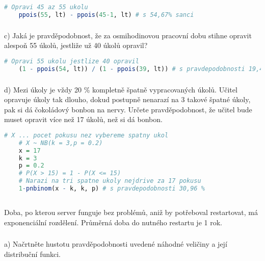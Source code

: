 \documentclass{article}%
\begin{document}
\begin{lstlisting}[language=R, showstringspaces=false, basicstyle=\small]
    # Opravi 45 az 55 ukolu
    ppois(55, lt) - ppois(45-1, lt) # s 54,67% sanci
\end{lstlisting}

\subsubsection{}
c) Jaká je pravděpodobnost, že za osmihodinovou pracovní dobu stihne opravit alespoň 55 úkolů, jestliže už 40 úkolů opravil?

\begin{lstlisting}[language=R, showstringspaces=false, basicstyle=\small]
    # Opravi 55 ukolu jestlize 40 opravil
    (1 - ppois(54, lt)) / (1 - ppois(39, lt)) # s pravdepodobnosti 19,4 %
\end{lstlisting}

\subsubsection{}
d) Mezi úkoly je vždy 20 \% kompletně špatně vypracovaných úkolů. Učitel opravuje úkoly tak dlouho, dokud postupně nenarazí na 3 takové špatné úkoly, pak si dá čokoládový bonbon na nervy. Určete pravděpodobnost, že učitel bude muset opravit více než 17 úkolů, než si dá bonbon.

\begin{lstlisting}[language=R, showstringspaces=false, basicstyle=\small]
    # X ... pocet pokusu nez vybereme spatny ukol
    # X ~ NB(k = 3,p = 0.2)
    x = 17
    k = 3
    p = 0.2
    # P(X > 15) = 1 - P(X <= 15)
    # Narazi na tri spatne ukoly nejdrive za 17 pokusu
    1-pnbinom(x - k, k, p) # s pravdepodobnosti 30,96 %
\end{lstlisting}


\newpage
\subsection{}
Doba, po kterou server funguje bez problémů, aniž by potřeboval restartovat, má exponenciální rozdělení. Průměrná doba do nutného restartu je 1 rok.

\subsubsection{}
a) Načrtněte hustotu pravděpodobnosti uvedené náhodné veličiny a její distribuční funkci.
\end{document}
